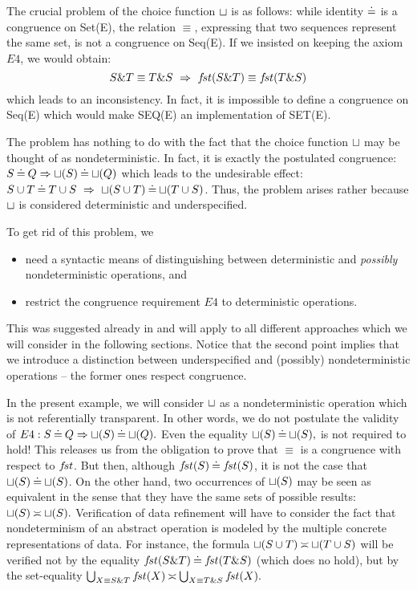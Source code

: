 The crucial problem of the choice function $ \sqcup $ is as follows: while identity $\mathbin{\doteq}$ is a congruence on Set(E), the relation $\equiv$, expressing that two sequences represent the same set, is not a congruence on Seq(E). If we insisted on keeping the axiom $E4$, we would obtain:
\begin{equation}\label{problem}
S\& T\equiv T\& S\ \mathrel\Rightarrow\ f\!st(S\& T)\equiv f\!st(T\& S) \end{equation}
which leads to an inconsistency. In fact, it is impossible to define a congruence on Seq(E) which would make
SEQ(E) an implementation of SET(E).

The problem has nothing to do with the fact that the choice function $\sqcup$ may be thought of as nondeterministic.
In fact, it is exactly the postulated congruence: $S\mathbin{\doteq} Q\mathrel\Rightarrow \sqcup(S)\mathbin{\doteq}\sqcup(Q)$
which leads to the undesirable
effect: \( S\cup T\mathbin{\doteq} T\cup S\ \mathrel\Rightarrow\ \sqcup(S\cup T)\mathbin{\doteq}\sqcup(T\cup S)\). Thus, the problem
arises rather because $\sqcup$ is considered deterministic and underspecified. %

To get rid of this problem, we
\begin{itemize}\MyLPar
\item need a syntactic means of distinguishing between deterministic and {\em possibly} nondeterministic operations, and \item restrict the congruence requirement $E4$ to deterministic operations. \end{itemize}
This was suggested already in \cite{QG} and will apply to all different approaches which we will consider in the following sections. Notice that the second
point implies that we introduce a distinction between underspecified and (possibly) nondeterministic operations -- the former ones respect congruence. 

In the present example, we will consider $\sqcup$ as a nondeterministic operation which is not referentially transparent. In other words, we do not postulate the 
validity of $E4: S\mathbin{\doteq} Q\mathrel\Rightarrow \sqcup(S)\mathbin{\doteq}\sqcup(Q).$ 
Even the equality $\sqcup(S)\mathbin{\doteq}\sqcup(S),$ is not required to hold!
This releases us from the obligation to prove that $\equiv$ is a congruence with
respect to $f\!st$.
But then, although $f\!st(S)\mathbin{\doteq} f\!st(S)$, it is not the case that $\sqcup(S)\mathbin{\doteq}
\sqcup(S)$. On the other hand, two occurrences of $\sqcup(S)$ may be seen as equivalent
in the sense that they have the same sets of possible results: $\sqcup(S)\mathbin{\asymp}\sqcup(S).$
Verification of data refinement will have to consider the fact that nondeterminism of an abstract operation is modeled by the multiple concrete representations of data. For instance, the formula $\sqcup(S\cup T)\mathbin{\asymp} \sqcup(T\cup S)$ will be verified not by the equality $f\!st(S\&T)\mathbin{\doteq} f\!st(T\&S)$ (which does no hold), but by the set-equality
$\bigcup_{X\equiv S\& T}f\!st(X) \mathbin{\asymp} \bigcup_{X\equiv T\& S}f\!st(X).$ 

